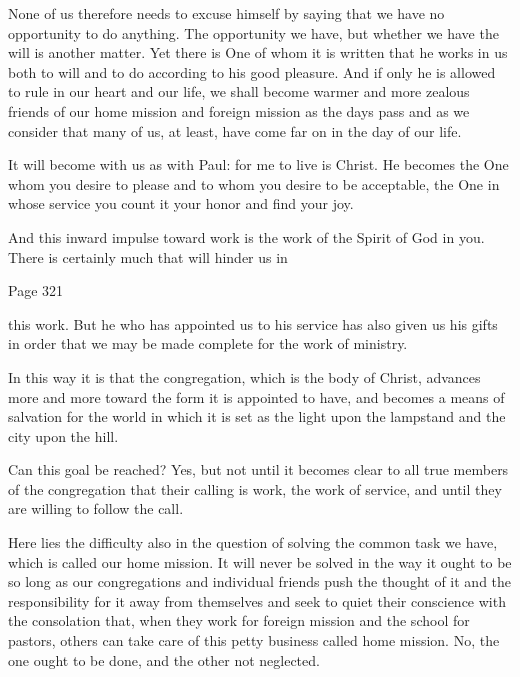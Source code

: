 None of us therefore needs to excuse himself by saying that we have no opportunity to do anything. The opportunity we have, but whether we have the will is another matter. Yet there is One of whom it is written that he works in us both to will and to do according to his good pleasure. And if only he is allowed to rule in our heart and our life, we shall become warmer and more zealous friends of our home mission and foreign mission as the days pass and as we consider that many of us, at least, have come far on in the day of our life.

It will become with us as with Paul: for me to live is Christ. He becomes the One whom you desire to please and to whom you desire to be acceptable, the One in whose service you count it your honor and find your joy.

And this inward impulse toward work is the work of the Spirit of God in you. There is certainly much that will hinder us in

Page 321

this work. But he who has appointed us to his service has also given us his gifts in order that we may be made complete for the work of ministry.

In this way it is that the congregation, which is the body of Christ, advances more and more toward the form it is appointed to have, and becomes a means of salvation for the world in which it is set as the light upon the lampstand and the city upon the hill.

Can this goal be reached? Yes, but not until it becomes clear to all true members of the congregation that their calling is work, the work of service, and until they are willing to follow the call.

Here lies the difficulty also in the question of solving the common task we have, which is called our home mission. It will never be solved in the way it ought to be so long as our congregations and individual friends push the thought of it and the responsibility for it away from themselves and seek to quiet their conscience with the consolation that, when they work for foreign mission and the school for pastors, others can take care of this petty business called home mission. No, the one ought to be done, and the other not neglected.
